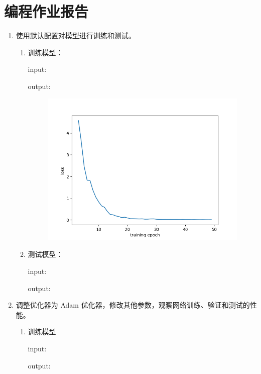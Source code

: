 \documentclass[a4paper]{article}
\begin{document}
\section{编程作业报告}
\begin{enumerate}
    \item 使用默认配置对模型进行训练和测试。
    \begin{enumerate}
        \item 训练模型：
        
        input:
        

        output:
        

        \begin{figure}[H]
            \centering
            \includegraphics[width=0.65\linewidth]{MyFile/img/1_1.png}
            \caption{}
        \end{figure}


        \item 测试模型：
        
        input:
        

        output:
        


    \end{enumerate}
    \item 调整优化器为 Adam 优化器，修改其他参数，观察网络训练、验证和测试的性能。
    \begin{enumerate}
        \item 训练模型
        
        input:
        

        output:
        
        

\end{enumerate}
\end{enumerate}
\end{document}
